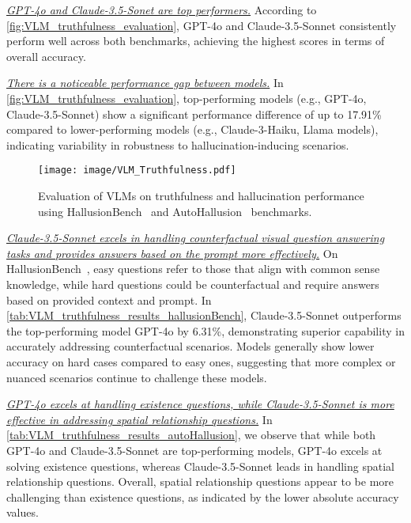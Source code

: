 \textit{\ul{GPT-4o and Claude-3.5-Sonet are top performers.}} According to \autoref{fig:VLM_truthfulness_evaluation}, GPT-4o and Claude-3.5-Sonnet consistently perform well across both benchmarks, achieving the highest scores in terms of overall accuracy.


\textit{\ul{There is a noticeable performance gap between models.}} In \autoref{fig:VLM_truthfulness_evaluation}, top-performing models (e.g., GPT-4o, Claude-3.5-Sonnet) show a significant performance difference of up to 17.91\% compared to lower-performing models (e.g., Claude-3-Haiku, Llama models), indicating variability in robustness to hallucination-inducing scenarios.



\setlength{\intextsep}{-1pt}
\begin{wrapfigure}[15]{r}{0.5\textwidth}
        \centering
        \texttt{[image: image/VLM\_Truthfulness.pdf]} %
        \caption{Evaluation of VLMs on truthfulness and hallucination performance using HallusionBench~\cite{HallusionBench} and AutoHallusion~\cite{AutoHallusion} benchmarks.}        \label{fig:VLM_truthfulness_evaluation}
\end{wrapfigure}


\textit{\ul{Claude-3.5-Sonnet excels in handling counterfactual visual question answering tasks and provides answers based on the prompt more effectively.}} On HallusionBench~\cite{HallusionBench}, easy questions refer to those that align with common sense knowledge, while hard questions could be counterfactual and require answers based on provided context and prompt. In \autoref{tab:VLM_truthfulness_results_hallusionBench}, Claude-3.5-Sonnet outperforms the top-performing model GPT-4o by 6.31\%, demonstrating superior capability in accurately addressing counterfactual scenarios. Models generally show lower accuracy on hard cases compared to easy ones, suggesting that more complex or nuanced scenarios continue to challenge these models.



\textit{\ul{GPT-4o excels at handling existence questions, while Claude-3.5-Sonnet is more effective in addressing spatial relationship questions.}} In \autoref{tab:VLM_truthfulness_results_autoHallusion}, we observe that while both GPT-4o and Claude-3.5-Sonnet are top-performing models, GPT-4o excels at solving existence questions, whereas Claude-3.5-Sonnet leads in handling spatial relationship questions. Overall, spatial relationship questions appear to be more challenging than existence questions, as indicated by the lower absolute accuracy values.

